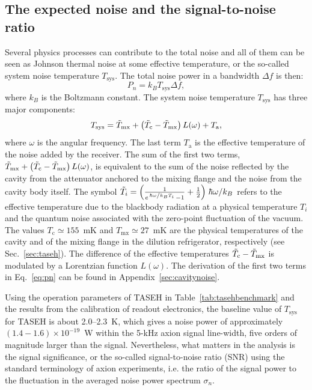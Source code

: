 \documentclass[%
reprint, %
superscriptaddress,
 amsmath,amssymb,
 aps
]{revtex4-2}
\begin{document}
\subsection{The expected noise and the signal-to-noise ratio}
\label{sec:intronoise}
Several physics processes can contribute to the total noise and all of them 
can be seen as Johnson thermal noise at some effective temperature, or the 
so-called system noise temperature $T_\text{sys}$. The total noise power in a 
bandwidth $\Delta f$ is then:
\begin{equation}
  P_n = k_B T_\text{sys} \Delta f, 
\end{equation}
where $k_B$ is the Boltzmann constant. 
The system noise temperature $T_\text{sys}$ has three major components: 
\begin{equation}
 T_\text{sys} = \Tilde{T}_\text{mx} + \left(\Tilde{T}_\text{c}-\Tilde{T}_\text{mx}\right)L(\omega) + T_\text{a},
\label{eq:pn}
\end{equation}
where $\omega$ is the angular frequency. 
The last term $T_\text{a}$ is the effective temperature of the 
noise added by the receiver. 
The sum of the first two terms, 
$\Tilde{T}_\text{mx} + \left(\Tilde{T}_\text{c}-\Tilde{T}_\text{mx}\right)L(\omega)$, %
is equivalent to the sum of the noise reflected by the cavity from the 
attenuator anchored to the mixing flange and the noise from the cavity body 
itself. The symbol 
$\Tilde{T}_i=\left(\frac{1}{e^{\left.\hbar\omega\middle/k_BT_i\right.}-1} + \frac{1}{2}\right)\left. \hbar\omega\middle/k_B\right.$ refers to the effective 
temperature due to the blackbody radiation at a physical temperature $T_i$ and 
the quantum noise associated with the zero-point fluctuation of the vacuum. 
The values $T_\text{c}\simeq155$~mK and $T_\text{mx}\simeq27$~mK are the 
physical temperatures of the cavity and of the mixing flange in the dilution 
refrigerator, respectively (see Sec.~\ref{sec:taseh}). The difference 
of the effective temperatures $\Tilde{T}_\text{c}-\Tilde{T}_\text{mx}$ is 
modulated by a Lorentzian function $L(\omega)$. 
The derivation of the first two terms in Eq.~\eqref{eq:pn} can be found in 
Appendix~\ref{sec:cavitynoise}. 


Using the operation parameters of TASEH in Table~\ref{tab:tasehbenchmark} and 
the results from the calibration of readout electronics, 
the baseline value of $T_\text{sys}$ for TASEH 
is about 2.0--2.3~K, which gives a noise power of approximately 
$\left(1.4-1.6\right)\times 10^{-19}$~W within the 5-kHz axion signal 
line-width, five orders of magnitude larger than the signal. Nevertheless, what
 matters in the analysis is the signal significance, or the so-called 
signal-to-noise ratio (SNR) using the standard terminology of axion 
experiments, i.e. the ratio of the signal power to the fluctuation in the 
averaged noise power spectrum $\sigma_n$. 
\end{document}
